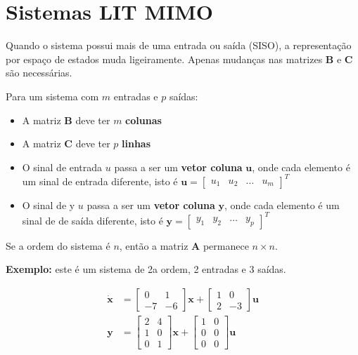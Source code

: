\documentclass[
]{book}
\providecommand{\tightlist}{%
  \setlength{\itemsep}{0pt}\setlength{\parskip}{0pt}}
\begin{document}
\hypertarget{sistemas-lit-mimo}{%
\section{Sistemas LIT MIMO}\label{sistemas-lit-mimo}}

Quando o sistema possui mais de uma entrada ou saída (SISO), a representação por espaço de estados muda ligeiramente. Apenas mudanças nas matrizes \(\mathbf{B}\) e \(\mathbf{C}\) são necessárias.

Para um sistema com \(m\) entradas e \(p\) saídas:

\begin{itemize}
\tightlist
\item
  A matriz \(\mathbf{B}\) deve ter \(m\) \textbf{colunas}
\item
  A matriz \(\mathbf{C}\) deve ter \(p\) \textbf{linhas}
\item
  O sinal de entrada \(u\) passa a ser um \textbf{vetor coluna} \(\mathbf{u}\), onde cada elemento é um sinal de entrada diferente, isto é \(\mathbf{u} = \begin{bmatrix}u_1 & u_2 & \ldots & u_m\end{bmatrix}^T\)
\item
  O sinal de y \(u\) passa a ser um \textbf{vetor coluna} \(\mathbf{y}\), onde cada elemento é um sinal de de saída diferente, isto é \(\mathbf{y} = \begin{bmatrix}y_1 & y_2 & \ldots & y_p\end{bmatrix}^T\)
\end{itemize}

Se a ordem do sistema é \(n\), então a matriz \(\mathbf{A}\) permanece \(n\times n\).

\textbf{Exemplo:} este é um sistema de 2a ordem, 2 entradas e 3 saídas.

\begin{align}
 \dot{\mathbf{x}} &= \left[\begin{array}{rr}
 0 & 1 \\ -7 & -6 \end{array}\right] \mathbf{x} + \left[\begin{array}{rr} 1 &0 \\ 2 &-3\end{array}\right]\mathbf{u}\\
 \mathbf{y} &= \left[\begin{array}{rr}2 & 4\\ 1& 0\\ 0 &1\end{array}\right]\mathbf{x} + \left[\begin{array}{rr}1 & 0 \\0 & 0 \\ 0 & 0 \end{array}\right]\mathbf{u}
\end{align}
\end{document}
